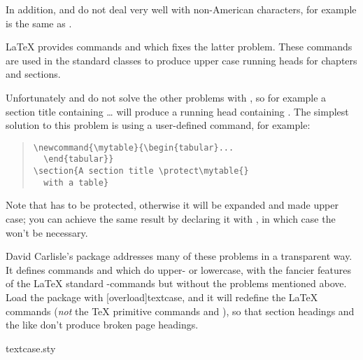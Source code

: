 In addition,  and  do not deal very well
with non-American characters, for example
 is the same as .

\LaTeX{} provides commands  and 
which fixes the latter problem.  These commands are used in the
standard classes to produce upper case running heads for chapters
and sections.

Unfortunately  and  do not solve
the other problems with , so for example a section
title containing  \dots{}
 will produce a running head containing
.  The simplest solution to this problem is
using a user-defined command, for example: 
\begin{quote}
\begin{verbatim}
\newcommand{\mytable}{\begin{tabular}...
  \end{tabular}}
\section{A section title \protect\mytable{}
  with a table}
\end{verbatim}
\end{quote}
Note that  has to be protected, otherwise it will be
expanded and made upper case; you can achieve the same result by
declaring it with , in which case the
 won't be necessary.

David Carlisle's  package
addresses many of these problems in a transparent way.  It defines
commands  and  which do
upper- or lowercase, with the fancier features of the \LaTeX{}
standard -commands but without the problems
mentioned above.  Load the package with
[overload]{textcase}, and it will redefine the \LaTeX{}
commands (\emph{not} the \TeX{} primitive commands  and
), so that section headings and the like don't produce
broken page headings.
\begin{ctanrefs}
\item[textcase.sty]
\end{ctanrefs}


